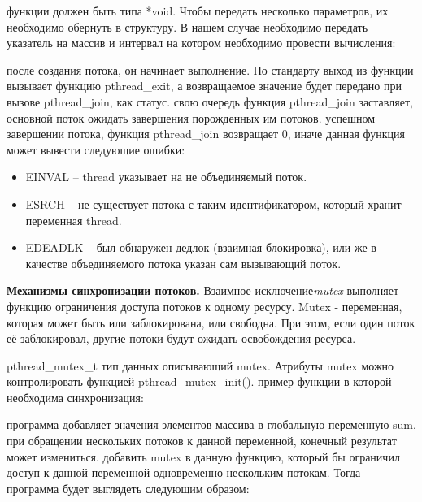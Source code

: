{	 функции должен быть типа *void. Чтобы передать несколько параметров, их необходимо обернуть в структуру. В нашем случае необходимо передать указатель на массив и интервал на котором необходимо провести вычисления:
	\begin{figure}[H]
		
	\end{figure}
	 после создания потока, он начинает выполнение. По стандарту выход из функции вызывает функцию pthread\_exit, а возвращаемое значение будет передано при вызове pthread\_join, как статус.
	 свою очередь функция pthread\_join заставляет, основной поток ожидать завершения порожденных им потоков.
	 успешном завершении потока, функция pthread\_join возвращает 0, иначе данная функция может вывести следующие ошибки:
	\begin{itemize}
	    \item EINVAL – thread указывает на не объединяемый поток.
	    \item ESRCH – не существует потока с таким идентификатором, который хранит переменная thread.
	    \item EDEADLK – был обнаружен дедлок (взаимная блокировка), или же в качестве объединяемого потока указан сам вызывающий поток.
	\end{itemize}
	\par\textbf{Механизмы синхронизации потоков.} Взаимное исключение\textit{mutex} выполняет функцию ограничения доступа потоков к одному ресурсу. Mutex - переменная, которая может быть или заблокирована, или свободна. При этом, если один поток её заблокировал, другие потоки будут ожидать освобождения ресурса.
	\begin{figure}[H]
		
	\end{figure}
	\par pthread\_mutex\_t тип данных описывающий mutex. Атрибуты mutex можно контролировать функцией
pthread\_mutex\_init().
     пример функции в которой необходима синхронизация:
    \begin{figure}[H]
		
	\end{figure}
	 программа добавляет значения элементов массива в глобальную переменную sum, при обращении нескольких потоков к данной переменной, конечный результат может измениться.
	 добавить mutex в данную функцию, который бы ограничил доступ к данной переменной одновременно нескольким потокам. Тогда программа будет выглядеть следующим образом:
	\begin{figure}[H]

\end{figure}}
